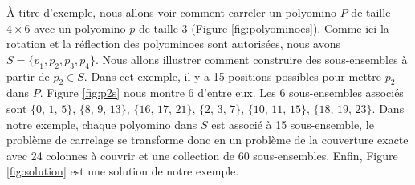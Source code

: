 \documentclass[a4paper,12pt]{article}
\begin{document}
À titre d'exemple, nous allons voir comment carreler un polyomino $P$ de taille $4\times6$ avec un polyomino $p$ de taille $3$ (Figure \ref{fig:polyominoes}). Comme ici la rotation et la réflection des polyominoes sont autorisées, nous avons $S=\{p_1, p_2, p_3, p_4\}$. Nous allons illustrer comment construire des sous-ensembles à partir de $p_2\in S$. Dans cet exemple, il y a 15 positions possibles pour mettre $p_2$ dans $P$. Figure \ref{fig:p2s} nous montre 6 d'entre eux. Les 6 sous-ensembles associés sont $\{0,\,1,\,5\},\,\{8,\,9,\,13\},\,\{16,\,17,\,21\},\,\{2,\,3,\,7\},\,\{10,\,11,\,15\},\,\{18,\,19,\,23\}$. Dans notre exemple, chaque polyomino dans $S$ est associé à 15 sous-ensemble, le problème de carrelage se transforme donc en un problème de la couverture exacte avec 24 colonnes à couvrir et une collection de 60 sous-ensembles. Enfin, Figure \ref{fig:solution} est une solution de notre exemple.
\end{document}
